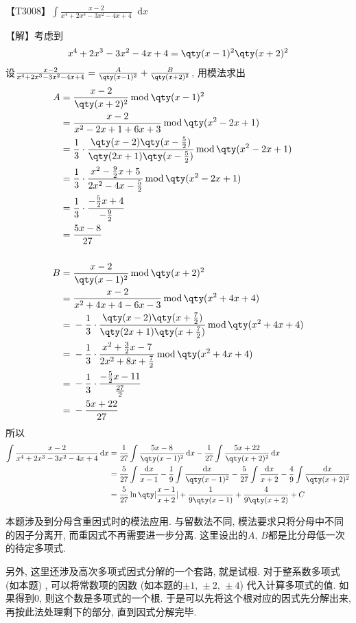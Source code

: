 \documentclass{ctexbook}
\newcommand*{\dif}{\mathop{}\!\mathrm{d}}
\newcommand{\m}{\,\mathrm{mod}\,}
\begin{document}
{【T3008】$\int\frac{x-2}{x^{4}+2x^{3}-3x^{2}-4x+4}\dif{x}$\par
【解】考虑到
\begin{align*}
x^{4}+2x^{3}-3x^{2}-4x+4=\qty(x-1)^{2}\qty(x+2)^{2}
\end{align*}
设$\frac{x-2}{x^{4}+2x^{3}-3x^{2}-4x+4}=\frac{A}{\qty(x-1)^{2}}+\frac{B}{\qty(x+2)^{2}}$, 用模法求出
\begin{align*}
A={}&\frac{x-2}{\qty(x+2)^{2}}\m\qty(x-1)^{2}\\
={}&\frac{x-2}{x^{2}-2x+1+6x+3}\m\qty(x^{2}-2x+1)\\
={}&\frac{1}{3}\cdot\frac{\qty(x-2)\qty(x-\frac{5}{2})}{\qty(2x+1)\qty(x-\frac{5}{2})}\m\qty(x^{2}-2x+1)\\
={}&\frac{1}{3}\cdot\frac{x^{2}-\frac{9}{2}x+5}{2x^{2}-4x-\frac{5}{2}}\m\qty(x^{2}-2x+1)\\
={}&\frac{1}{3}\cdot\frac{-\frac{5}{2}x+4}{-\frac{9}{2}}\\
={}&\frac{5x-8}{27}\\
\\
B={}&\frac{x-2}{\qty(x-1)^{2}}\m\qty(x+2)^{2}\\
={}&\frac{x-2}{x^{2}+4x+4-6x-3}\m\qty(x^{2}+4x+4)\\
={}&-\frac{1}{3}\cdot\frac{\qty(x-2)\qty(x+\frac{7}{2})}{\qty(2x+1)\qty(x+\frac{7}{2})}\m\qty(x^{2}+4x+4)\\
={}&-\frac{1}{3}\cdot\frac{x^{2}+\frac{3}{2}x-7}{2x^{2}+8x+\frac{7}{2}}\m\qty(x^{2}+4x+4)\\
={}&-\frac{1}{3}\cdot\frac{-\frac{5}{2}x-11}{\frac{27}{2}}\\
={}&-\frac{5x+22}{27}
\end{align*}
所以
\begin{align*}
\int\frac{x-2}{x^{4}+2x^{3}-3x^{2}-4x+4}\dif{x}={}&\frac{1}{27}\int\frac{5x-8}{\qty(x-1)^{2}}\dif{x}-\frac{1}{27}\int\frac{5x+22}{\qty(x+2)^{2}}\dif{x}\\
={}&\frac{5}{27}\int\frac{\dif{x}}{x-1}-\frac{1}{9}\int\frac{\dif{x}}{\qty(x-1)^{2}}-\frac{5}{27}\int\frac{\dif{x}}{x+2}-\frac{4}{9}\int\frac{\dif{x}}{\qty(x+2)^{2}}\\
={}&\frac{5}{27}\ln\qty|\frac{x-1}{x+2}|+\frac{1}{9\qty(x-1)}+\frac{4}{9\qty(x+2)}+C
\end{align*}\par
{\kaishu 本题涉及到分母含重因式时的模法应用. 与留数法不同, 模法要求只将分母中不同的因子分离开, 而重因式不再需要进一步分离. 这里设出的$A,\,B$都是比分母低一次的待定多项式. \par
另外, 这里还涉及高次多项式因式分解的一个套路, 就是试根. 对于整系数多项式 (如本题) , 可以将常数项的因数 (如本题的$\pm1,\,\pm2,\,\pm4$) 代入计算多项式的值. 如果得到$0$, 则这个数是多项式的一个根. 于是可以先将这个根对应的因式先分解出来, 再按此法处理剩下的部分, 直到因式分解完毕. \par}
}
\end{document}
